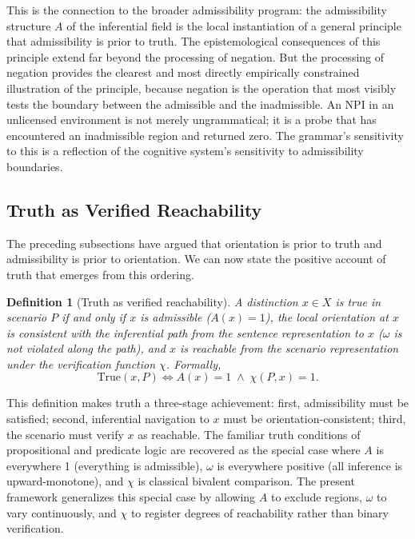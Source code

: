 \documentclass[12pt]{article}
\newtheorem{definition}[theorem]{Definition}
\theoremstyle{remark}
\begin{document}
This is the connection to the broader admissibility program: the
admissibility structure $A$ of the inferential field is the local
instantiation of a general principle that admissibility is prior to
truth. The epistemological consequences of this principle extend far
beyond the processing of negation. But the processing of negation
provides the clearest and most directly empirically constrained
illustration of the principle, because negation is the operation that
most visibly tests the boundary between the admissible and the
inadmissible. An NPI in an unlicensed environment is not merely
ungrammatical; it is a probe that has encountered an inadmissible
region and returned zero. The grammar's sensitivity to this is a
reflection of the cognitive system's sensitivity to admissibility
boundaries.

\subsection{Truth as Verified Reachability}

The preceding subsections have argued that orientation is prior to truth
and admissibility is prior to orientation. We can now state the positive
account of truth that emerges from this ordering.

\begin{definition}[Truth as verified reachability]
A distinction $x \in X$ is \emph{true in scenario} $P$ if and only if
$x$ is admissible ($A(x) = 1$), the local orientation at $x$ is
consistent with the inferential path from the sentence representation to
$x$ ($\omega$ is not violated along the path), and $x$ is reachable
from the scenario representation under the verification function $\chi$.
Formally,
\[
\mathrm{True}(x, P) \iff A(x) = 1 \;\wedge\; \chi(P, x) = 1.
\]
\end{definition}
This definition makes truth a three-stage achievement: first,
admissibility must be satisfied; second, inferential navigation to $x$
must be orientation-consistent; third, the scenario must verify $x$ as
reachable. The familiar truth conditions of propositional and predicate
logic are recovered as the special case where $A$ is everywhere 1
(everything is admissible), $\omega$ is everywhere positive (all
inference is upward-monotone), and $\chi$ is classical bivalent
comparison. The present framework generalizes this special case by
allowing $A$ to exclude regions, $\omega$ to vary continuously, and
$\chi$ to register degrees of reachability rather than binary
verification.
\end{document}
